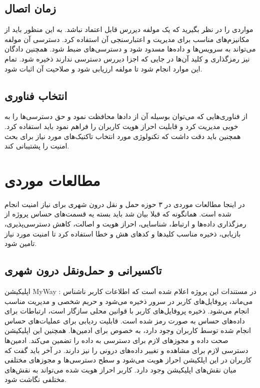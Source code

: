 \subsection{زمان اتصال}
مواردی را در نظر بگیرید که یک مولفه دیررس قابل اعتماد نباشد. 
به این منظور باید از مکانیزم‌های مناسب برای مدیریت و اعتبارسنجی آن‌ استفاده کرد. دسترسی آن مولفه می‌تواند به سرویس‌ها و داده‌ها مسدود شود و دسترسی‌های ضبط شود. همچنین دادگان نیز رمزگذاری و کلید آن‌ها در جایی که اجزا دیررس دسترسی ندارند ذخیره شود. تمام این موارد انجام شود تا مولفه ارزیابی شود و صلاحیت آن اثبات شود.

\subsection{انتخاب فناوری}
از فناوری‌هایی که می‌توان بوسیله آن از داد‌ها محافظت نمود و حق دسترسی‌ها را به خوبی مدیریت کرد و قابلیت احراز هویت کاربران را فراهم نمود باید استفاده کرد.
همچنین باید دقت داشت که تکنولوژی مورد انتخاب تاکتیک‌های مورد نیاز برای بحث امنیت را پشتیبانی کند.




\section{مطالعات موردی}

در اینجا مطالعات موردی در ۳ حوزه حمل و نقل درون شهری برای نیاز امنیت انجام شده است.
همانگونه که قبلا بیان شد باید بسته یه قسمت‌های حساس پروژه از رمزگذاری داد‌ه‌ها و ارتباط، شناسایی، احراز هویت و اصالت، کاهش دسترسی‌پذیری، بازیابی، ذخیره مناسب کلید‌ها و کدهای هش و خطا استفاده کرد تا امنیت مورد نیاز تامین شود.
 
\subsection{تاکسیرانی و حمل‌و‌نقل درون شهری}

اپلیکیشن MyWay :  در مستندات این پروژه اعلام شده است که اطلاعات کاربر ناشناس می‌ماند، پروفایل‌های کاربر در سرور ذخیره می‌شود و حریم شخصی و مدیریت مناسب انجام می‌شود. ذخیره پروفایل‌های کاربر با قوانین محلی سازگار است، ارتباطات برای داده‌های حساس به صورت رمز شده است.  قابلیت ردیابی برای عملیات‌های حساس انجام شده توسط کاربران وجود دارد، به خصوص برای ادمین‌ها. همچنین این اپلیکیشن صحت داده و مجوز‌های لازم برای دسترسی به داده را تضمین می‌کند. ادمین‌ها دسترسی لازم برای مشاهده و تغییر داده‌های درونی را نیز دارند.
در آخر باید گفت که کاربران در این اپلکیشن احراز هویت می‌شود و سطح دسترسی‌ها و مجوزهای مختلفی میان نقش‌های اپلیکیشن وجود دارد. کاربر احراز هویت شده می‌تواند به نقش‌های مختلفی نگاشت شود.

